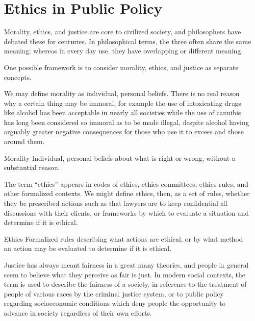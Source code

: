 
\label {apx:ethics}
\chapter{Ethics in Public Policy}

\nocite{Tideman2006}

Morality, ethics, and justice are core to civilized society, and philosophers have debated these for centuries.  In philosophical terms, the three often share the same meaning; whereas in every day use, they have overlapping or different meaning.

One possible framework is to consider morality, ethics, and justice as separate concepts.

We may define morality as individual, personal beliefs.  There is no real reason why a certain thing may be immoral, for example the use of intoxicating drugs like alcohol has been acceptable in nearly all societies while the use of cannibis has long been considered so immoral as to be made illegal, despite alcohol having arguably greater negative consequences for those who use it to excess and those around them.

\begin{definition}{Morality}
    Individual, personal beliefs about what is right or wrong, without a substantial reason.
\end{definition}

The term ``ethics'' appears in codes of ethics, ethics committees, ethics rules, and other formalized contexts.  We might define ethics, then, as a set of rules, whether they be prescribed actions such as that lawyers are to keep confidential all discussions with their clients, or frameworks by which to evaluate a situation and determine if it is ethical.

\begin{definition}{Ethics}
    Formalized rules describing what actions are ethical, or by what method an action may be evaluated to determine if it is ethical.
\end{definition}

Justice has always meant fairness in a great many theories, and people in general seem to believe what they perceive as fair is just.  In modern social contexts, the term is used to describe the fairness of a society, in reference to the treatment of people of various races by the criminal justice system, or to public policy regarding socioeconomic conditions which deny people the opportunity to advance in society regardless of their own efforts.

